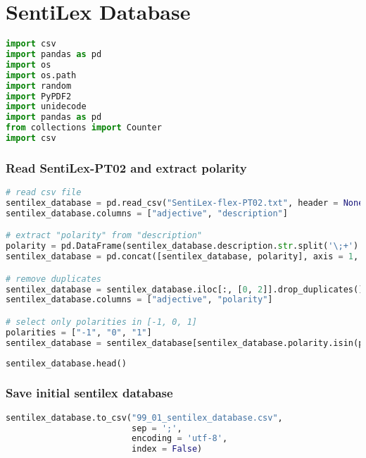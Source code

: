 \section{SentiLex Database}\label{ape:sentilex_database}

\begin{lstlisting}[language=Python]
import csv
import pandas as pd
import os
import os.path
import random
import PyPDF2
import unidecode
import pandas as pd
from collections import Counter
import csv
\end{lstlisting}

\subsubsection{Read SentiLex-PT02 and extract
polarity}\label{read-sentilex-pt02-and-extract-polarity}

\begin{lstlisting}[language=Python]
# read csv file
sentilex_database = pd.read_csv("SentiLex-flex-PT02.txt", header = None)
sentilex_database.columns = ["adjective", "description"]

# extract "polarity" from "description"
polarity = pd.DataFrame(sentilex_database.description.str.split('\;+').str[3].str.split('\=+').str[1])
sentilex_database = pd.concat([sentilex_database, polarity], axis = 1, join = 'outer')

# remove duplicates
sentilex_database = sentilex_database.iloc[:, [0, 2]].drop_duplicates()
sentilex_database.columns = ["adjective", "polarity"]

# select only polarities in [-1, 0, 1]
polarities = ["-1", "0", "1"]
sentilex_database = sentilex_database[sentilex_database.polarity.isin(polarities)]
\end{lstlisting}

\begin{lstlisting}[language=Python]
sentilex_database.head()
\end{lstlisting}

\subsubsection{Save initial sentilex
database}\label{save-initial-sentilex-database}

\begin{lstlisting}[language=Python]
sentilex_database.to_csv("99_01_sentilex_database.csv",
                         sep = ';',
                         encoding = 'utf-8',
                         index = False)
\end{lstlisting}

